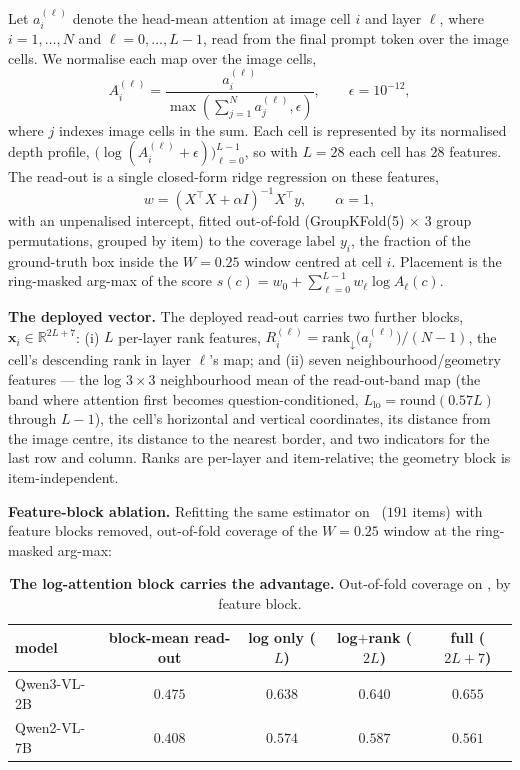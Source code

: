 Let $a_i^{(\ell)}$ denote the head-mean attention at image cell $i$ and layer $\ell$, where
$i=1,\ldots,N$ and $\ell=0,\ldots,L-1$, read from the final prompt token over the image cells. We normalise
each map over the image cells,
\begin{equation}
    A_i^{(\ell)} = \frac{a_i^{(\ell)}}{\max\!\left(\sum_{j=1}^{N}a_j^{(\ell)},\epsilon\right)},
    \qquad \epsilon=10^{-12},
\end{equation}
where $j$ indexes image cells in the sum. Each cell is represented by its normalised depth profile,
$\bigl(\log(A_i^{(\ell)}+\epsilon)\bigr)_{\ell=0}^{L-1}$, so with $L=28$ each cell has $28$ features. The read-out
is a single closed-form ridge regression on these features,
\begin{equation}
    w = (X^\top X + \alpha I)^{-1} X^\top y, \qquad \alpha=1,
\end{equation}
with an unpenalised intercept, fitted out-of-fold (GroupKFold(5) $\times$ 3 group permutations, grouped by item)
to the coverage label $y_i$, the fraction of the ground-truth box inside the $W{=}0.25$ window centred at cell
$i$. Placement is the ring-masked arg-max of the score $s(c) = w_0 + \sum_{\ell=0}^{L-1} w_\ell \log A_\ell(c)$.

\textbf{The deployed vector.} The deployed read-out carries two further blocks,
$\mathbf{x}_i\in\mathbb{R}^{2L+7}$: (i) $L$ per-layer rank features,
$R_i^{(\ell)}=\mathrm{rank}_\downarrow\!\bigl(a_i^{(\ell)}\bigr)/(N-1)$, the cell's descending rank in layer
$\ell$'s map; and (ii) seven neighbourhood/geometry features --- the log $3\times3$ neighbourhood mean of the
read-out-band map (the band where attention first becomes question-conditioned,
$L_{\mathrm{lo}}=\mathrm{round}(0.57L)$ through $L-1$), the cell's horizontal and vertical coordinates, its
distance from the image centre, its distance to the nearest border, and two indicators for the last row and
column. Ranks are per-layer and item-relative; the geometry block is item-independent.

\textbf{Feature-block ablation.} Refitting the same estimator on \vstar\ ($191$ items) with feature blocks
removed, out-of-fold coverage of the $W{=}0.25$ window at the ring-masked arg-max:

\begin{table}[h]\centering\small
\caption{\textbf{The log-attention block carries the advantage.} Out-of-fold coverage on \vstar, by feature
block.}
\begin{tabular}{lcccc}
\toprule
model & block-mean read-out & log only ($L$) & log$+$rank ($2L$) & full ($2L{+}7$)\\
\midrule
Qwen3-VL-2B & $0.475$ & $0.638$ & $0.640$ & $\mathbf{0.655}$\\
Qwen2-VL-7B & $0.408$ & $0.574$ & $\mathbf{0.587}$ & $0.561$\\
\bottomrule
\end{tabular}\label{tab:featabl}
\end{table}


